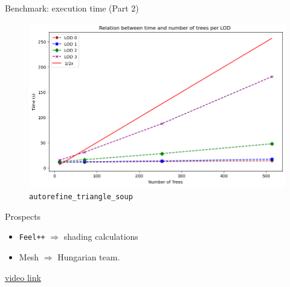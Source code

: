\documentclass[10pt]{beamer}
\begin{document}
\begin{frame}{Benchmark: execution time (Part 2)}
  \Large
  \begin{figure}[H]
    \centering
    \includegraphics[width=1\textwidth]{images/bench_time_ntree_linear.png}
    \caption{\texttt{autorefine\_triangle\_soup}}
  \end{figure}
\end{frame}

\begin{frame}{Prospects}
  \Large
  \begin{itemize}
    \item \texttt{Feel++} $\Longrightarrow$ shading calculations
    \item Mesh $\Longrightarrow$ Hungarian team.
  \end{itemize}
  \href{https://youtu.be/O6flpW6jR60}{video link}
  \begin{center}
\end{center}
\end{frame}


\nocite{*}


\end{document}
